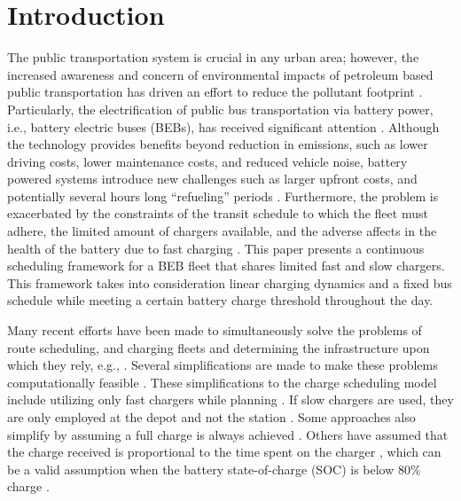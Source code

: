 \documentclass[utf8]{FrontiersinHarvard}
\let\cite\citep                                                                 %
\begin{document}

\section{Introduction}
\label{sec:introduction}
The public transportation system is crucial in any urban area; however, the increased awareness and concern of
environmental impacts of petroleum based public transportation has driven an effort to reduce the pollutant footprint
\cite{DeFilippo2014, Xylia2018, Guida2017, Li2016}. Particularly, the electrification of public bus transportation via
battery power, i.e., battery electric buses (BEBs), has received significant attention \cite{Li2016}. Although the
technology provides benefits beyond reduction in emissions, such as lower driving costs, lower maintenance costs, and
reduced vehicle noise, battery powered systems introduce new challenges such as larger upfront costs, and potentially
several hours long ``refueling'' periods \cite{Xylia2018, Li2016}. Furthermore, the problem is exacerbated by the
constraints of the transit schedule to which the fleet must adhere, the limited amount of chargers available, and the
adverse affects in the health of the battery due to fast charging \cite{Lutsey2019}. This paper presents a continuous
scheduling framework for a BEB fleet that shares limited fast and slow chargers. This framework takes into consideration
linear charging dynamics and a fixed bus schedule while meeting a certain battery charge threshold throughout the day.

Many recent efforts have been made to simultaneously solve the problems of route scheduling, and charging fleets and determining
the infrastructure upon which they rely, e.g., \cite{Wei2018, Sebastiani2016, Hoke2014, Wang2017}. Several simplifications
are made to make these problems computationally feasible . These simplifications to the charge
scheduling model include utilizing only fast chargers while planning \cite{Wei2018, Sebastiani2016, Wang2017,
  Zhou2020-0, Liu2020, Yang2018, Wang2017a, Qin2016}. If slow chargers are used, they are only employed at the depot and
not the station \cite{He2020, Tang2019}. Some approaches also simplify by assuming a full charge is always achieved \cite{Wei2018, Wang2017, Zhou2020-0,
  Wang2017a}. Others have assumed that the charge received is proportional to the time spent on the charger
\cite{Liu2020, Yang2018}, which can be a valid assumption when the battery state-of-charge (SOC) is below 80\% charge
\cite{Liu2020}.
\end{document}
